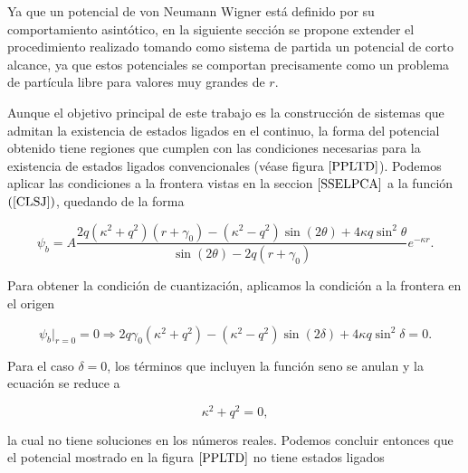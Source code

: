 Ya que un potencial de von Neumann Wigner está definido por su comportamiento asintótico, en la siguiente sección se propone extender el procedimiento realizado tomando como sistema de partida un potencial de corto alcance, ya que estos potenciales se comportan precisamente como un problema de partícula libre para valores muy grandes de $r$.

Aunque el objetivo principal de este trabajo es la construcción de sistemas que admitan la existencia de estados ligados en el continuo, la forma del potencial obtenido tiene regiones que cumplen con las condiciones necesarias para la existencia de estados ligados convencionales (véase figura $\ref{PPLTD}$). Podemos aplicar las condiciones a la frontera  vistas en la seccion  $\ref{SSELPCA}$ a la función $(\ref{CLSJ})$, quedando de la forma

\begin{equation*}
\psi_b = A \frac{2 q (\kappa^2 + q^2)(r + \gamma_0) - (\kappa^2 - q^2)\sin(2 \theta) + 4 \kappa q \sin^2 \theta }{\sin(2 \theta)-2q(r + \gamma_0)}e^{- \kappa r}.
\end{equation*}


Para obtener la condición de cuantización, aplicamos la condición a la frontera en el origen

\begin{equation*}
\psi_b|_{r=0} = 0 \Rightarrow 2 q \gamma_0 (\kappa^2 + q^2) - (\kappa^2 - q^2)\sin(2 \delta) + 4 \kappa q \sin^2 \delta = 0.
\end{equation*}

Para el caso $\delta = 0$, los términos que incluyen la función seno se anulan y la ecuación se reduce a

\begin{equation*}
\kappa^2 + q^2  = 0,
\end{equation*}

la cual no tiene soluciones en los números reales. Podemos concluir entonces que el potencial mostrado en la figura $\ref{PPLTD}$ no tiene estados ligados

